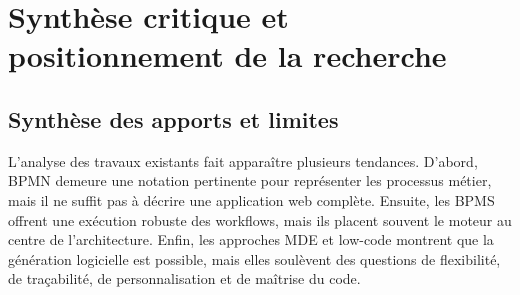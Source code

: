 \documentclass[12pt,a4paper]{article}
\begin{document}
\section{Synthèse critique et positionnement de la recherche}

\subsection{Synthèse des apports et limites}

L'analyse des travaux existants fait apparaître plusieurs tendances. D'abord, BPMN demeure une notation pertinente pour représenter les processus métier, mais il ne suffit pas à décrire une application web complète. Ensuite, les BPMS offrent une exécution robuste des workflows, mais ils placent souvent le moteur au centre de l'architecture. Enfin, les approches MDE et low-code montrent que la génération logicielle est possible, mais elles soulèvent des questions de flexibilité, de traçabilité, de personnalisation et de maîtrise du code.
\end{document}

